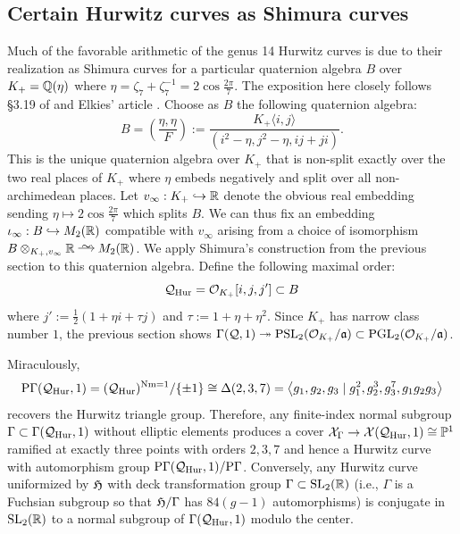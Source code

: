 \documentclass[main.tex]{subfiles}
\begin{document}
\subsection{Certain Hurwitz curves as Shimura curves} \label{sec:shimura_as_hurwitz}

Much of the favorable arithmetic of the genus 14 Hurwitz curves is due to their realization as Shimura curves for a particular quaternion algebra $B$ over $K_+ = \mathbb{Q}(\eta)$ where $\eta = \zeta_7 + \zeta_7^{-1} = 2 \cos{\tfrac{2\pi}{7}}$. The exposition here closely follows \S3.19 of \cite{shimura:curves} and Elkies' article \cite[\S4.4]{elkies:klein_quartic}. Choose as $B$ the following quaternion algebra:
\[ B = \left( \frac{\eta, \eta}{F} \right) := \frac{K_+ \langle i, j \rangle}{(i^2 - \eta, j^2 - \eta, ij + ji)}. \]
This is the unique quaternion algebra over $K_+$ that is non-split exactly over the two real places of $K_+$ where $\eta$ embeds negatively and split over all non-archimedean places. Let $v_{\infty} : K_+ \hookrightarrow \mathbb{R}$ denote the obvious real embedding sending $\eta \mapsto 2 \cos{\tfrac{2\pi}{7}}$ which splits $B$. We can thus fix an embedding $\iota_{\infty} : B \hookrightarrow M_2(\mathbb{R})$ compatible with $v_{\infty}$ arising from a choice of isomorphism $B \ot_{K_+, v_{\infty}} \RR \iso M_2(\RR)$. We apply Shimura's construction from the previous section to this quaternion algebra. Define the following maximal order:
\[ \mathcal{Q}_{\mathrm{Hur}} = \mathcal{O}_{K_+}[i,j,j'] \subset B \]
where $j' := \tfrac{1}{2}(1 + \eta i + \tau j)$ and $\tau := 1 + \eta + \eta^2$. Since $K_+$ has narrow class number $1$, the previous section shows $\Gamma(\mathcal{Q},1) \twoheadrightarrow \mathrm{PSL}_2(\mathcal{O}_{K_+} / \mathfrak{a}) \subset \mathrm{PGL}_2(\mathcal{O}_{K_+} / \mathfrak{a})$.
\par
Miraculously,
\[ \mathrm{P} \Gamma(\mathcal{Q}_{\mathrm{Hur}}, 1) = (\mathcal{Q}_{\mathrm{Hur}})^{\operatorname{\mathrm{Nm}} = 1} / \{ \pm 1 \} \cong \Delta(2,3,7) = \left< g_1, g_2, g_3 \mid g_1^2, g_2^3, g_3^7, g_1 g_2 g_3 \right> \]
recovers the Hurwitz triangle group. Therefore, any finite-index normal subgroup $\Gamma \subset \Gamma(\mathcal{Q}_{\mathrm{Hur}}, 1)$ without elliptic elements produces a cover $\mathcal{X}_{\Gamma} \to \mathcal{X}(\mathcal{Q}_{\mathrm{Hur}},1) \cong \mathbb{P}^1$ ramified at exactly three points with orders $2,3,7$ and hence a Hurwitz curve with automorphism group $\mathrm{P} \Gamma(\mathcal{Q}_{\mathrm{Hur}},1) / \mathrm{P} \Gamma$. Conversely, any Hurwitz curve uniformized by $\mathfrak{H}$ with deck transformation group $\Gamma \subset \mathrm{SL}_2(\mathbb{R})$ (i.e., $\Gamma$ is a Fuchsian subgroup so that $\mathfrak{H} / \Gamma$ has $84(g-1)$ automorphisms) is conjugate in $\mathrm{SL}_2(\mathbb{R})$ to a normal subgroup of $\Gamma(\mathcal{Q}_{\mathrm{Hur}}, 1)$ modulo the center.
\par
\end{document}
